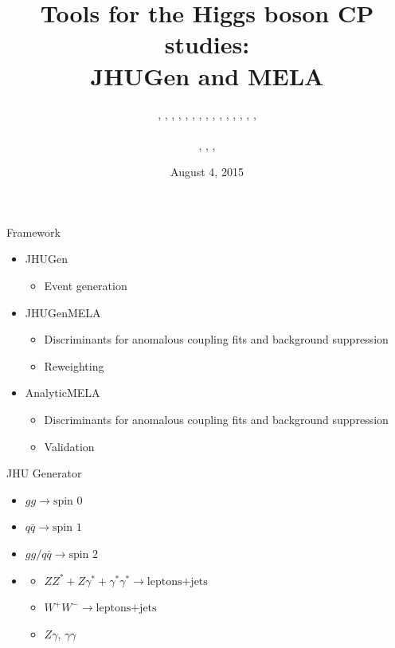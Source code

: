 \documentclass[usenames,dvipsnames,svgnames,table]{beamer}
\title[JHUGen and MELA]{Tools for the Higgs boson CP studies: \\ JHUGen and MELA}
\author[Heshy Roskes]{\CMS{I. Anderson}, \Sara{S. Bolognesi}, \theory{F. Caola}, \ATLAS{Y. Gao}, \CMS{A. Gritsan}, \theory{Z. Guo}, \CMS{C. Martin}, \theory{K. Melnikov}, \me{H. Roskes}, \CMS{U. Sarica}, \theory{M. Schulze}, \CMS{N. Tran}, \CMS{A. Whitbeck}, \CMS{M. Xiao}, \CMS{C. You}, \theory{Y. Zhou}
\texorpdfstring{\\ \leavevmode
\\
\ATLAS{ATLAS}, \CMS{CMS}, \theory{theory}, \Sara{where is Sara?}}{}}
\date{August 4, 2015}
\newcommand{\spin}[1]{\text{spin }#1}
\begin{document}
\begin{frame}
\titlepage
\end{frame}

\begin{frame}{Framework}

\begin{itemize}
\small
\item JHUGen
\begin{itemize}
\item Event generation
\end{itemize}
\item JHUGenMELA
\begin{itemize}
\item Discriminants for anomalous coupling fits and background suppression
\item Reweighting
\end{itemize}
\item AnalyticMELA
\begin{itemize}
\item Discriminants for anomalous coupling fits and background suppression
\item Validation
\end{itemize}
\end{itemize}

\end{frame}


\begin{frame}{JHU Generator}
\begin{itemize}
\item $gg\to\spin{0}$
\item $q\bar{q}\to\spin{1}$
\item $gg/q\bar{q}\to\spin{2}$
\end{itemize}
\begin{itemize}
\item
\begin{itemize}[label={$\to$}]
\item $ZZ^*+Z\gamma^*+\gamma^*\gamma^*\to \text{leptons+jets}$
\item $W^+W^-\to \text{leptons+jets}$
\item $Z\gamma$, $\gamma\gamma$
\end{itemize}
\end{itemize}
\end{frame}
\end{document}
